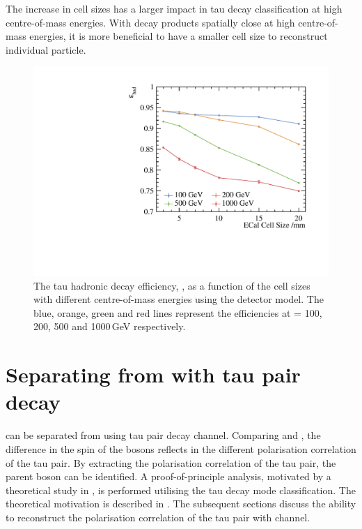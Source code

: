 The increase in \ECAL cell sizes has a larger impact in tau decay classification at high centre-of-mass energies. With decay products spatially close at high centre-of-mass energies, it is more beneficial to have a smaller \ECAL cell size to reconstruct individual particle.

\begin{figure}[htbp]
\centering %
\includegraphics[width=.85\textwidth]{tau/plots3/hadronicEff.pdf}
\caption[The tau hadronic decay efficiency as a function of  the \ECAL cell sizes at different \sqrtS with the \ILD detector model.]
{The tau hadronic decay efficiency, \tauHad, as a function of  the \ECAL cell sizes with different centre-of-mass energies using the \ILD detector model. The blue, orange, green and red lines  represent the efficiencies at \sqrtS = 100, 200, 500 and 1000\,GeV respectively.}
\label{fig:TauHadronicEfficiency}
\end{figure}


\section{Separating \PHiggs from \PZ with tau pair decay}
\label{sec:tauHZ}
\PHiggs can be separated from  \PZ using  tau pair decay channel. Comparing \HiggsToTauTau  and \ZToTauTau, the difference in the spin of the bosons reflects in the different polarisation correlation of the tau pair. By extracting the polarisation correlation of the tau pair, the parent boson can be identified. A proof-of-principle analysis, motivated by a theoretical study in \cite{Bullock:1991my}, is performed utilising the tau decay mode classification. The theoretical motivation is described in . The subsequent sections discuss the ability to reconstruct the polarisation correlation of the tau pair with \ZToTauTau channel.


